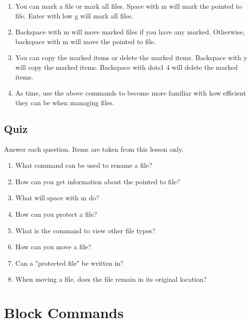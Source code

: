 \documentclass[10pt,letterpaper,twoside]{report}
\begin{document}
{{{\begin{enumerate}
		      \item You can mark a file or mark all files.  Space with m will mark the pointed to file.  Enter with low g will mark all files.
		      \item Backspace with m will move marked files if you have any marked.  Otherwise, backspace with m will move the pointed to file.
		      \item You can copy the marked items or delete the marked items.  Backspace with y will copy the marked items.  Backspace with dots1 4 will delete the marked items.
		      \item As time, use the above commands to become more familiar with how efficient they can be when managing files.
	      \end{enumerate}
	      \clearpage

\subsection{Quiz}
	      Answer each question. Items are taken from this lesson only.
	      \begin{enumerate}
		      \item What command can be used to rename a file?
		      \item How can you get information about the pointed to file?
		      \item What will space with m do?
		      \item How can you protect a file?
		      \item What is the command to view other file types?
		      \item How can you move a file?
		      \item Can a "protected file" be written in?
		      \item When moving a file, does the file remain in its original location?
	      \end{enumerate}

\clearpage

\section{ Block Commands}
\

}}}
\end{document}
